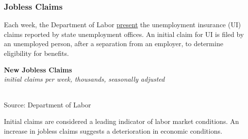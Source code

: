 \documentclass{report}
\newcommand{\tbllink}[1]{\href{https://raw.githubusercontent.com/bdecon/US-chartbook/master/chartbook/data/#1}{\faTable}}
\newcommand{\shticks}{
		date coordinates in=x, axis line style={draw=none},
		xmax={2023-10-01},
		}
\newcommand{\bbar}[2]{extra #1 ticks = {{#2}}, extra #1 tick labels = ,
		extra #1 tick style = {grid=major, grid style={thick, black!25}},}
\newcommand{\stdline}[4]{\addplot[very thick, no markers, color=#1] 
		table [x=#2, y=#3, col sep=comma] {#4};	}
\begin{document}
{\begin{minipage}{0.76\textwidth}
\subsubsection*{Jobless Claims}
\small Each week, the Department of Labor \href{https://www.dol.gov/ui/data.pdf}{present} the unemployment insurance (UI) claims reported by state unemployment offices. An initial claim for UI is filed by an unemployed person, after a separation from an employer, to determine eligibility for benefits.
\end{minipage}
\vspace{1mm}

\begin{minipage}{0.42\textwidth}
\normalsize \textbf{New Jobless Claims}\\
\footnotesize{\textit{initial claims per week, thousands, seasonally adjusted}}
\vspace*{-2mm}

\hspace*{-2mm} \\
\footnotesize{Source: Department of Labor} \hfill \tbllink{icsa.csv} \hspace{1mm}
\end{minipage} \hspace{4mm} \begin{minipage}{0.3\textwidth}
\small 

Initial claims are considered a leading indicator of labor market conditions. An increase in jobless claims suggests a deterioration in economic conditions. 
\end{minipage}
\vspace{1mm}

}
\end{document}
